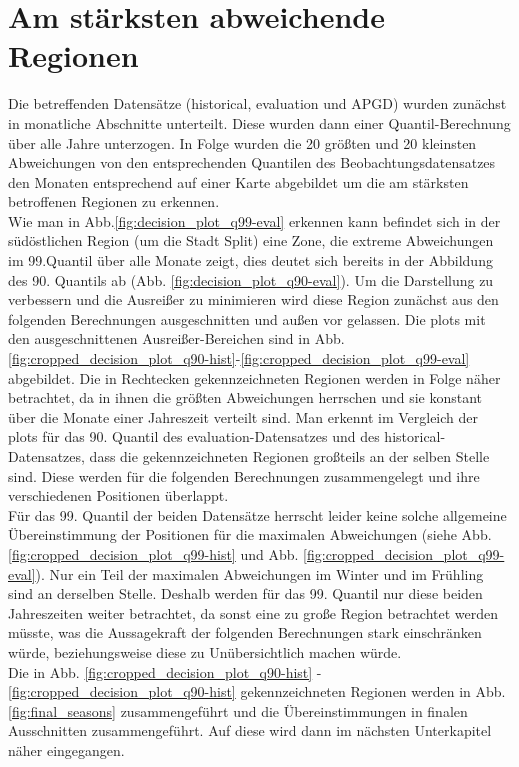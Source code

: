 \section{Am stärksten abweichende Regionen}
Die betreffenden Datensätze (historical, evaluation und APGD) wurden zunächst in monatliche Abschnitte unterteilt. Diese wurden dann einer Quantil-Berechnung über alle Jahre unterzogen. In Folge wurden die 20 größten und 20 kleinsten Abweichungen von den entsprechenden Quantilen des Beobachtungsdatensatzes den Monaten entsprechend auf einer Karte abgebildet um die am stärksten betroffenen Regionen zu erkennen.\\
Wie man in Abb.\ref{fig:decision_plot_q99-eval} erkennen kann befindet sich in der südöstlichen Region (um die Stadt Split) eine Zone, die extreme Abweichungen im 99.Quantil über alle Monate zeigt, dies deutet sich bereits in der Abbildung des 90. Quantils ab (Abb. \ref{fig:decision_plot_q90-eval}). Um die Darstellung zu verbessern und die Ausreißer zu minimieren wird diese Region zunächst aus den folgenden Berechnungen ausgeschnitten und außen vor gelassen. Die plots mit den ausgeschnittenen Ausreißer-Bereichen sind in Abb. \ref{fig:cropped_decision_plot_q90-hist}-\ref{fig:cropped_decision_plot_q99-eval} abgebildet. Die in Rechtecken gekennzeichneten Regionen werden in Folge näher betrachtet, da in ihnen die größten Abweichungen herrschen und sie konstant über die Monate einer Jahreszeit verteilt sind. Man erkennt im Vergleich der plots für das 90. Quantil des evaluation-Datensatzes und des historical-Datensatzes, dass die gekennzeichneten Regionen großteils an der selben Stelle sind. Diese werden für die folgenden Berechnungen zusammengelegt und ihre verschiedenen Positionen überlappt.\\
Für das 99. Quantil der beiden Datensätze herrscht leider keine solche allgemeine Übereinstimmung der Positionen für die maximalen Abweichungen (siehe Abb. \ref{fig:cropped_decision_plot_q99-hist} und Abb. \ref{fig:cropped_decision_plot_q99-eval}). Nur ein Teil der maximalen Abweichungen im Winter und im Frühling sind an derselben Stelle. Deshalb werden für das 99. Quantil nur diese beiden Jahreszeiten weiter betrachtet, da sonst eine zu große Region betrachtet werden müsste, was die Aussagekraft der folgenden Berechnungen stark einschränken würde, beziehungsweise diese zu Unübersichtlich machen würde.\\
Die in Abb. \ref{fig:cropped_decision_plot_q90-hist} - \ref{fig:cropped_decision_plot_q90-hist} gekennzeichneten Regionen werden in Abb. \ref{fig:final_seasons} zusammengeführt und die Übereinstimmungen in finalen Ausschnitten zusammengeführt. Auf diese wird dann im nächsten Unterkapitel näher eingegangen.

